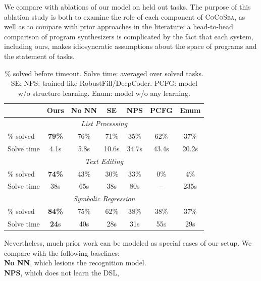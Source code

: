 \documentclass{article}
\newcommand{\systemEnding}{\textsc{CoCoSea}}
\newcommand{\expect}{\mathds{E}} %
\newcommand{\probability}{\mathds{P}} %
\begin{document}
We compare with ablations of our model on held out tasks.
The purpose of this ablation study is 
both to examine the role of each component of \systemEnding,
as well as to compare with
prior approaches in the literature:
a head-to-head
comparison of program synthesizers is complicated by the fact that
each system, including ours, makes idiosyncratic 
assumptions about the space of programs and the statement of tasks.
\begin{table}
\vspace{-5pt}
\tabcolsep=2.5pt
\renewcommand{\arraystretch}{0.5}
\begin{tabular}{lcccccc}
  \toprule& Ours& 
    No NN & SE&NPS & PCFG & Enum \\
  \midrule
  \multicolumn{7}{c}{\emph{List Processing}}\\
  \midrule
  \% solved&\textbf{79\%} &76\% &71\%&35\%&62\%&37\%\\
  Solve time&  4.1s&5.8s&10.6s&34.7s&43.4s&20.2s\\
  \midrule
  \multicolumn{7}{c}{\emph{Text Editing}}\\
  \midrule
  \% solved&\textbf{74\%} &43\% &30\%&33\%&0\%&4\%\\
  Solve time& 38s&65s&38s&80s&--&235s\\
  \midrule
  \multicolumn{7}{c}{\emph{Symbolic Regression}}\\
  \midrule
  \% solved&   \textbf{84\% }&75\%&62\%&38\%&38\%&37\% \\
  Solve time&  \textbf{24}s& 40s  &28s&31s&55s&29s\\
  \bottomrule
  \end{tabular}
\caption{\% solved before timeout. Solve time: averaged over solved
  tasks.  SE: NPS: trained like RobustFill/DeepCoder.  PCFG: model w/o
  structure learning.  Enum: model w/o any learning.  %
}\vspace{-0.5cm}\label{baselineComparisons} \end{table}
Nevertheless, much prior work can be modeled as
special cases of our setup. 
We compare with the following baselines:
\\\noindent \textbf{No NN}, which lesions the recognition model.
\\\noindent \textbf{NPS}, which does not learn the DSL,
\end{document}
